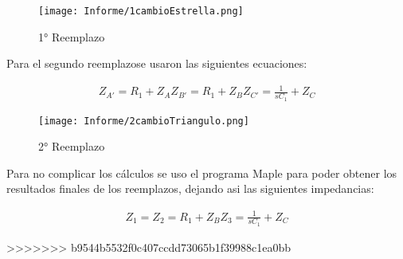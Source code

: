 \begin{figure}[h]
	\caption{1° Reemplazo}
	\centering
	\texttt{[image: Informe/1cambioEstrella.png]}
	\label{1reemplazo} 
\end{figure}

Para el segundo reemplazose usaron las siguientes ecuaciones:

\begin{align}
	\begin{equation}
		Z_{A'}= R_1 + Z_{A}
	\end{equation}
	\begin{equation}
		Z_{B'}= R_1 + Z_{B}
	\end{equation}
	
	\begin{equation}
		Z_{C'}= \frac{1}{sC_1} + Z_{C}
	\end{equation}
\end{align}

\begin{figure}[h]
	\caption{2° Reemplazo}
	\centering
	\texttt{[image: Informe/2cambioTriangulo.png]}
	\label{2reemplazo} 
\end{figure}


Para no complicar los cálculos se uso el programa Maple para poder obtener los resultados finales de los reemplazos, dejando asi las siguientes impedancias:

\begin{align}
	\begin{equation}
		Z_{1}= 
	\end{equation}
	\begin{equation}
		Z_{2}= R_1 + Z_{B}
	\end{equation}
	
	\begin{equation}
		Z_{3}= \frac{1}{sC_1} + Z_{C}
	\end{equation}
\end{align}




>>>>>>> b9544b5532f0c407ccdd73065b1f39988c1ea0bb
